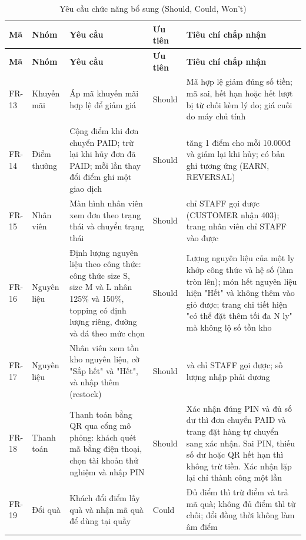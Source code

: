 {\small
\begin{longtable}{@{}L{1.2cm}L{1.6cm}L{4.9cm}L{1.3cm}L{4.9cm}@{}}
\caption{Yêu cầu chức năng bổ sung (Should, Could, Won't)}\label{tab:frbosung}\\
\toprule
\textbf{Mã} & \textbf{Nhóm} & \textbf{Yêu cầu} & \textbf{Ưu tiên} & \textbf{Tiêu chí chấp nhận} \\ \midrule \endfirsthead
\toprule \textbf{Mã} & \textbf{Nhóm} & \textbf{Yêu cầu} & \textbf{Ưu tiên} & \textbf{Tiêu chí chấp nhận} \\ \midrule \endhead
\bottomrule \endfoot
FR-13 & Khuyến mãi & Áp mã khuyến mãi hợp lệ để giảm giá & Should & Mã hợp lệ giảm đúng số tiền; mã sai, hết hạn hoặc hết lượt bị từ chối kèm lý do; giá cuối do máy chủ tính \\
FR-14 & Điểm thưởng & Cộng điểm khi đơn chuyển PAID; trừ lại khi hủy đơn đã PAID; mỗi lần thay đổi điểm ghi một giao dịch & Should &  tăng 1 điểm cho mỗi 10.000đ và giảm lại khi hủy; có bản ghi  tương ứng (EARN, REVERSAL) \\
FR-15 & Nhân viên & Màn hình nhân viên xem đơn theo trạng thái và chuyển trạng thái & Should &  chỉ STAFF gọi được (CUSTOMER nhận 403); trang nhân viên chỉ STAFF vào được \\
FR-16 & Nguyên liệu & Định lượng nguyên liệu theo công thức: công thức size S, size M và L nhân 125\% và 150\%, topping có định lượng riêng, đường và đá theo mức chọn & Should & Lượng nguyên liệu của một ly khớp công thức và hệ số (làm tròn lên); món hết nguyên liệu hiện "Hết" và không thêm vào giỏ được; trang chi tiết hiện "có thể đặt thêm tối đa N ly" mà không lộ số tồn kho \\
FR-17 & Nguyên liệu & Nhân viên xem tồn kho nguyên liệu, cờ "Sắp hết" và "Hết", và nhập thêm (restock) & Should &  và  chỉ STAFF gọi được; số lượng nhập phải dương \\
FR-18 & Thanh toán & Thanh toán bằng QR qua cổng mô phỏng: khách quét mã bằng điện thoại, chọn tài khoản thử nghiệm và nhập PIN & Should & Xác nhận đúng PIN và đủ số dư thì đơn chuyển PAID và trang đặt hàng tự chuyển sang xác nhận. Sai PIN, thiếu số dư hoặc QR hết hạn thì không trừ tiền. Xác nhận lặp lại chỉ thành công một lần \\
FR-19 & Đổi quà & Khách đổi điểm lấy quà và nhận mã quà để dùng tại quầy & Could & Đủ điểm thì trừ điểm và trả mã quà; không đủ điểm thì từ chối; đổi đồng thời không làm âm điểm \\

\end{longtable}}

